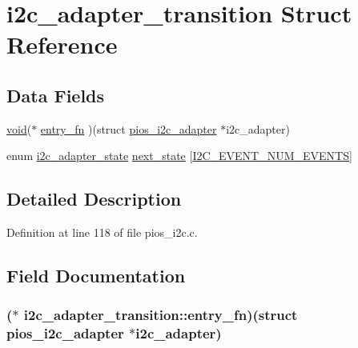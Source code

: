 \hypertarget{structi2c__adapter__transition}{\section{i2c\-\_\-adapter\-\_\-transition Struct Reference}
\label{structi2c__adapter__transition}
}
\subsection*{Data Fields}
\begin{DoxyCompactItemize}
\item 
\hyperlink{group___n_a_m_e_ga18028b8badbf1ea7e704ccac3c488e82}{void}($\ast$ \hyperlink{structi2c__adapter__transition_ac14dc1e0fd399564ba74506ebef339f9}{entry\-\_\-fn} )(struct \hyperlink{structpios__i2c__adapter}{pios\-\_\-i2c\-\_\-adapter} $\ast$i2c\-\_\-adapter)
\item 
enum \hyperlink{pios__i2c__priv_8h_ac73b69ffe53544057fa2e4751fd9c22b}{i2c\-\_\-adapter\-\_\-state} \hyperlink{structi2c__adapter__transition_aeb924ed73ea6faa20f16115e325c9125}{next\-\_\-state} \mbox{[}\hyperlink{group___p_i_o_s___i2_c_gga2a8f77797f5dbd873514e92d3d043649a0cb4ba8c0e16a415465ec638e89ac7b3}{I2\-C\-\_\-\-E\-V\-E\-N\-T\-\_\-\-N\-U\-M\-\_\-\-E\-V\-E\-N\-T\-S}\mbox{]}
\end{DoxyCompactItemize}


\subsection{Detailed Description}


Definition at line 118 of file pios\-\_\-i2c.\-c.



\subsection{Field Documentation}
\hypertarget{structi2c__adapter__transition_ac14dc1e0fd399564ba74506ebef339f9}{
\subsubsection[{entry\-\_\-fn}]{($\ast$ i2c\-\_\-adapter\-\_\-transition\-::entry\-\_\-fn)(struct {\bf pios\-\_\-i2c\-\_\-adapter} $\ast$i2c\-\_\-adapter)}}\label{structi2c__adapter__transition_ac14dc1e0fd399564ba74506ebef339f9}


